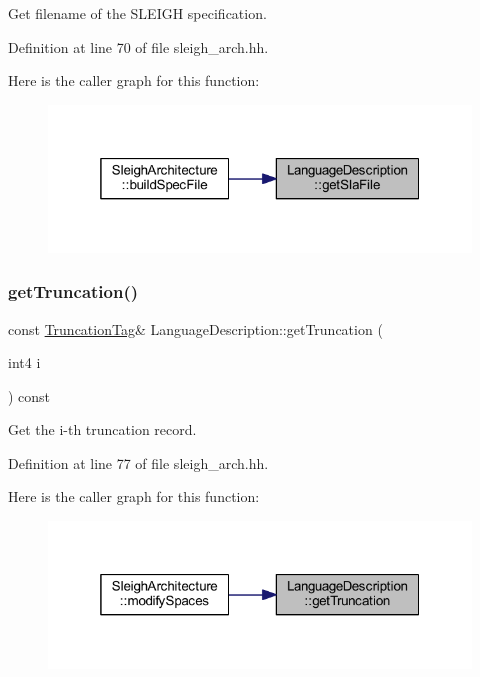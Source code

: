 Get filename of the S\+L\+E\+I\+GH specification. 



Definition at line 70 of file sleigh\+\_\+arch.\+hh.

Here is the caller graph for this function\+:
\nopagebreak
\begin{figure}[H]
\begin{center}
\leavevmode
\includegraphics[width=319pt]{class_language_description_a5db9068afb97964df97afab3c10af9ad_icgraph}
\end{center}
\end{figure}
\mbox{\label{class_language_description_abbf47b3b7347ba1bbe9a8fae01b2d4b9}} 
\subsubsection{\texorpdfstring{getTruncation()}{getTruncation()}}
{\footnotesize\ttfamily const \mbox{\hyperlink{class_truncation_tag}{Truncation\+Tag}}\& Language\+Description\+::get\+Truncation (\begin{DoxyParamCaption}\item[{int4}]{i }\end{DoxyParamCaption}) const\hspace{0.3cm}{\ttfamily [inline]}}



Get the i-\/th truncation record. 



Definition at line 77 of file sleigh\+\_\+arch.\+hh.

Here is the caller graph for this function\+:
\nopagebreak
\begin{figure}[H]
\begin{center}
\leavevmode
\includegraphics[width=319pt]{class_language_description_abbf47b3b7347ba1bbe9a8fae01b2d4b9_icgraph}
\end{center}
\end{figure}
\mbox{\label{class_language_description_aeeb814dd5212cea3f7636de4ac22acea}} 
